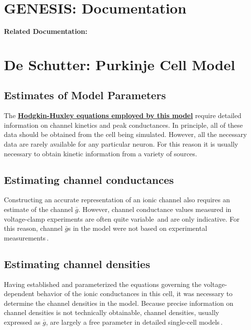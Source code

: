 \documentclass[12pt]{article}
\begin{document}
\section*{GENESIS: Documentation}

{\bf Related Documentation:}

\section*{De Schutter: Purkinje Cell Model}

\subsection*{Estimates of Model Parameters}

The \href{../pub-purkinje-deschutter1-equations1/pub-purkinje-deschutter1-equations1.tex}{\bf Hodgkin-Huxley equations employed by this model} require detailed information on channel kinetics and peak conductances. In principle,
all of these data should be obtained from the cell being simulated.
However, all the necessary data are rarely available for any
particular neuron. For this reason it is usually necessary to obtain
kinetic information from a variety of sources.

\subsection*{Estimating channel conductances}

Constructing an accurate
representation of an ionic channel also requires an estimate of
the channel $\bar g$. However, channel conductance values measured in
voltage-clamp experiments are often quite variable\,\cite{McCormick:1992fk} and are only indicative. For this reason,
channel $\bar g$s in the model were not based on experimental measurements\,\cite{S:1993dz, De-Schutter-E:1993fu}.

\subsection*{Estimating channel densities}

Having established and parameterized the equations governing the
voltage-dependent behavior of the ionic conductances in this
cell, it was necessary to determine the channel densities in the
model. Because precise information on channel densities is not
technically obtainable, channel densities, usually expressed as $\bar g$,
are largely a free parameter in detailed single-cell models\,\cite{S:1993dz, L:1992kl, W:1991qa, Traub-R-D:1991mi}.
\end{document}
